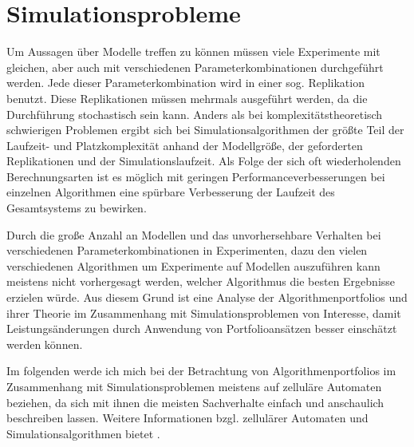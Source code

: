 \section{Simulationsprobleme}

Um Aussagen über Modelle treffen zu können müssen viele Experimente mit gleichen, aber auch mit verschiedenen Parameterkombinationen durchgeführt werden. Jede dieser Parameterkombination wird in einer sog. Replikation benutzt. Diese Replikationen müssen mehrmals ausgeführt werden, da die Durchführung stochastisch sein kann. Anders als bei komplexitätstheoretisch schwierigen Problemen ergibt sich bei Simulationsalgorithmen der größte Teil der Laufzeit- und Platzkomplexität anhand der Modellgröße, der geforderten Replikationen und der Simulationslaufzeit. Als Folge der sich oft wiederholenden Berechnungsarten ist es möglich mit geringen Performanceverbesserungen bei einzelnen Algorithmen eine spürbare Verbesserung der Laufzeit des Gesamtsystems zu bewirken. 

Durch die große Anzahl an Modellen und das unvorhersehbare Verhalten bei verschiedenen Parameterkombinationen in Experimenten, dazu den vielen verschiedenen Algorithmen um Experimente auf Modellen auszuführen kann meistens nicht vorhergesagt werden, welcher Algorithmus die besten Ergebnisse erzielen würde. Aus diesem Grund ist eine Analyse der Algorithmenportfolios und ihrer Theorie im Zusammenhang mit Simulationsproblemen von Interesse, damit Leistungsänderungen durch Anwendung von Portfolioansätzen besser einschätzt werden können.

Im folgenden werde ich mich bei der Betrachtung von Algorithmenportfolios im Zusammenhang mit Simulationsproblemen meistens auf zelluläre Automaten beziehen, da sich mit ihnen die meisten Sachverhalte einfach und anschaulich beschreiben lassen. Weitere Informationen bzgl. zellulärer Automaten und Simulationsalgorithmen bietet \cite{himmelspach09}.
